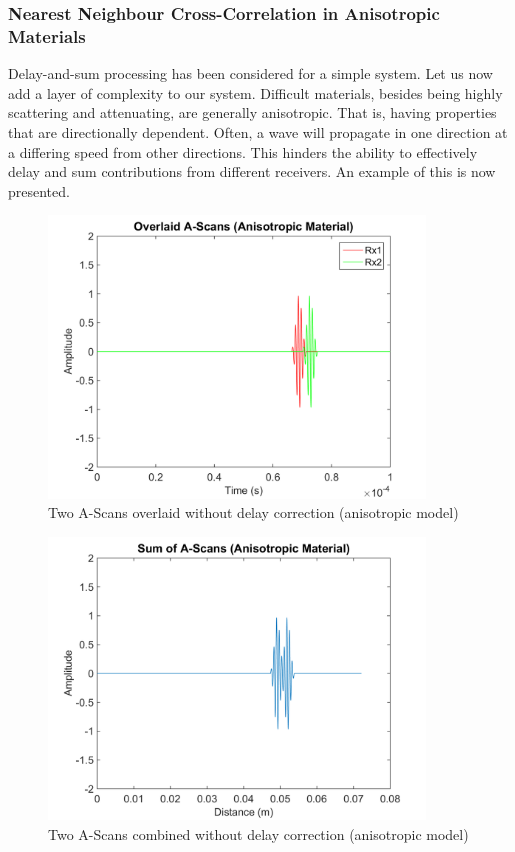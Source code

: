 \subsubsection{Nearest Neighbour Cross-Correlation in Anisotropic Materials}

Delay-and-sum processing has been considered for a simple system. Let us now add a layer of complexity to our system. Difficult materials, besides being highly scattering and attenuating, are generally anisotropic. That is, having properties that are directionally dependent. Often, a wave will propagate in one direction at a differing speed from other directions. This hinders the ability to effectively delay and sum contributions from different receivers. An example of this is now presented.

\begin{figure}[htb]
\centering
		\includegraphics[width=100mm]{Anisotropic_1.png}
		\caption{Two A-Scans overlaid without delay correction (anisotropic model)}
		\label{fig:cafi_anisotropic1}
\end{figure}

\begin{figure}[htb]
\centering
		\includegraphics[width=100mm]{Anisotropic_2.png}
		\caption{Two A-Scans combined without delay correction (anisotropic model)}
		\label{fig:cafi_anisotropic2}
\end{figure}


